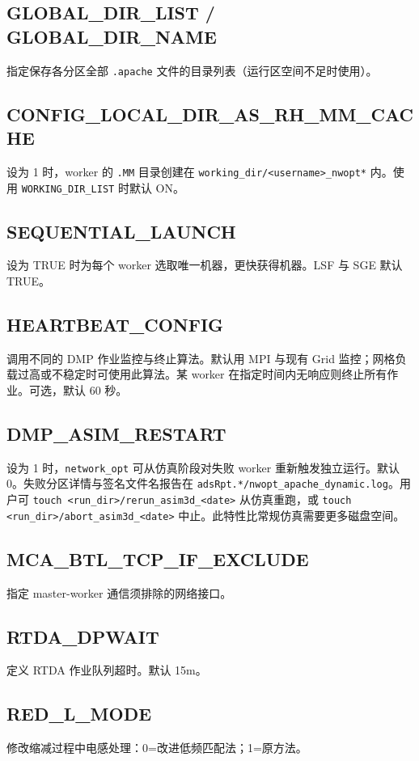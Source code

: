 \subsection{GLOBAL\_DIR\_LIST / GLOBAL\_DIR\_NAME}
指定保存各分区全部 \texttt{.apache} 文件的目录列表（运行区空间不足时使用）。

\subsection{CONFIG\_LOCAL\_DIR\_AS\_RH\_MM\_CACHE}
设为 1 时，worker 的 \texttt{.MM} 目录创建在 \texttt{working\_dir/<username>\_nwopt*} 内。使用 \texttt{WORKING\_DIR\_LIST} 时默认 ON。

\subsection{SEQUENTIAL\_LAUNCH}
设为 TRUE 时为每个 worker 选取唯一机器，更快获得机器。LSF 与 SGE 默认 TRUE。

\subsection{HEARTBEAT\_CONFIG}
调用不同的 DMP 作业监控与终止算法。默认用 MPI 与现有 Grid 监控；网格负载过高或不稳定时可使用此算法。某 worker 在指定时间内无响应则终止所有作业。可选，默认 60 秒。

\subsection{DMP\_ASIM\_RESTART}
设为 1 时，\texttt{network\_opt} 可从仿真阶段对失败 worker 重新触发独立运行。默认 0。失败分区详情与签名文件名报告在 \texttt{adsRpt.*/nwopt\_apache\_dynamic.log}。用户可 \texttt{touch <run\_dir>/rerun\_asim3d\_<date>} 从仿真重跑，或 \texttt{touch <run\_dir>/abort\_asim3d\_<date>} 中止。此特性比常规仿真需要更多磁盘空间。

\subsection{MCA\_BTL\_TCP\_IF\_EXCLUDE}
指定 master-worker 通信须排除的网络接口。

\subsection{RTDA\_DPWAIT}
定义 RTDA 作业队列超时。默认 15m。

\subsection{RED\_L\_MODE}
修改缩减过程中电感处理：0=改进低频匹配法；1=原方法。

